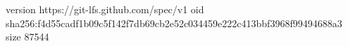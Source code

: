 version https://git-lfs.github.com/spec/v1
oid sha256:f4d55cadf1b09c5f142f7db69cb2e52c034459e222c413bbf3968f99494688a3
size 87544
